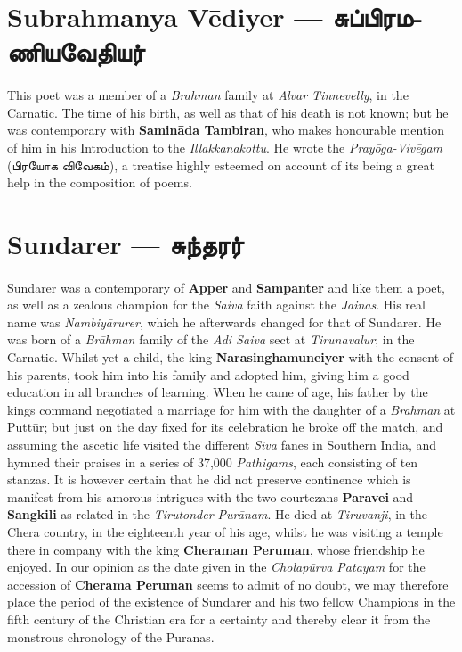 \documentclass{article}
\newcommand{\TamilText}[1]{\texttamil{#1}}
\newcommand{\TamilBold}[1]{\texttamil{\textbf{#1}}}
\newcommand{\tam}[1]{\TamilText{#1}}
\newcommand{\tambold}[1]{\TamilBold{#1}}
\begin{document}
\section{Subrahmanya V\={e}diyer --- \tambold{சுப்பிரமணியவேதியர்}}
\paragraph{}
This poet was a member of a \emph{Brahman} family at \emph{Alvar Tinnevelly}, in the Carnatic. The time of his birth, as well as that of his death is not known; but he was contemporary with \textbf{Samin\={a}da Tambiran}, who makes honourable mention of him in his Introduction to the \emph{Illakkanakottu}. He wrote the \emph{Pray\={o}ga-Viv\={e}gam} (\tam{பிரயோக விவேகம்}), a treatise highly esteemed on account of its being a great help in the composition of poems.

\section{Sundarer --- \tambold{சுந்தரர்}}
\paragraph{}
Sundarer was a contemporary of \textbf{Apper} and \textbf{Sampanter} and like them a poet, as well as a zealous champion for the \emph{Saiva} faith against the \emph{Jainas}. His real name was \emph{Nambiy\={a}rurer}, which he afterwards changed for that of Sundarer. He was born of a \emph{Br\={a}hman} family of the \emph{Adi Saiva} sect at \emph{Tirunavalur}; in the Carnatic. Whilst yet a child, the king \textbf{Narasinghamuneiyer} with the consent of his parents, took him into his family and adopted him, giving him a good education in all branches of learning. When he came of age, his father by the kings command negotiated a marriage for him with the daughter of a \emph{Brahman} at Putt\={u}r; but just on the day fixed for its celebration he broke off the match, and assuming the ascetic life visited the different \emph{Siva} fanes in Southern India, and hymned their praises in a series of 37,000 \emph{Pathigams}, each consisting of ten stanzas. It is however certain that he did not preserve continence which is manifest from his amorous intrigues with the two courtezans \textbf{Paravei} and \textbf{Sangkili} as related in the \emph{Tirutonder Pur\={a}nam}. He died at \emph{Tiruvanji}, in the Chera country, in the eighteenth year of his age, whilst he was visiting a temple there in company with the king \textbf{Cheraman Peruman}, whose friendship he enjoyed. In our opinion as the date given in the \emph{Cholap\={u}rva Patayam} for the accession of \textbf{Cherama Peruman} seems to admit of no doubt, we may therefore place the period of the existence of Sundarer and his two fellow Champions in the fifth century of the Christian era for a certainty and thereby clear it from the monstrous chronology of the Puranas.
\end{document}
